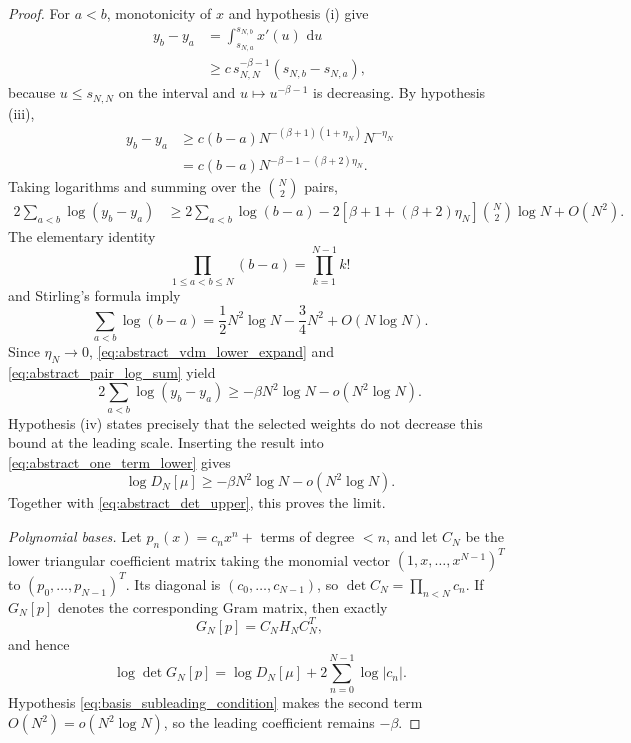 \documentclass[11pt]{amsart}
\numberwithin{equation}{section}
\theoremstyle{plain}
\theoremstyle{definition}
\theoremstyle{remark}
\newcommand{\dd}{\,\mathrm d}
\begin{document}
\begin{proof}
For $a<b$, monotonicity of $x$ and hypothesis (i) give
\begin{align}
y_b-y_a
&=\int_{s_{N,a}}^{s_{N,b}}x'(u)\,\dd u\\
&\ge c\,s_{N,N}^{-\beta-1}(s_{N,b}-s_{N,a}),
\end{align}
because $u\le s_{N,N}$ on the interval and $u\mapsto u^{-\beta-1}$ is decreasing.  By hypothesis (iii),
\begin{align}
y_b-y_a
&\ge c(b-a)
N^{-(\beta+1)(1+\eta_N)}N^{-\eta_N}\\
&=c(b-a)N^{-\beta-1-(\beta+2)\eta_N}.
\label{eq:abstract_node_gap_lower_rigorous}
\end{align}
Taking logarithms and summing over the $\binom N2$ pairs,
\begin{align}
2\sum_{a<b}\log(y_b-y_a)
&\ge 2\sum_{a<b}\log(b-a)
-2[\beta+1+(\beta+2)\eta_N]\binom N2\log N
+O(N^2).
\label{eq:abstract_vdm_lower_expand}
\end{align}
The elementary identity
\begin{equation}
\prod_{1\le a<b\le N}(b-a)=\prod_{k=1}^{N-1}k!
\end{equation}
and Stirling's formula imply
\begin{equation}
\sum_{a<b}\log(b-a)
=\frac12N^2\log N-\frac34N^2+O(N\log N).
\label{eq:abstract_pair_log_sum}
\end{equation}
Since $\eta_N\to0$, \eqref{eq:abstract_vdm_lower_expand} and \eqref{eq:abstract_pair_log_sum} yield
\begin{equation}
2\sum_{a<b}\log(y_b-y_a)
\ge-\beta N^2\log N-o(N^2\log N).
\end{equation}
Hypothesis (iv) states precisely that the selected weights do not decrease this bound at the leading scale.  Inserting the result into \eqref{eq:abstract_one_term_lower} gives
\begin{equation}
\log D_N[\mu]
\ge-\beta N^2\log N-o(N^2\log N).
\label{eq:abstract_det_lower}
\end{equation}
Together with \eqref{eq:abstract_det_upper}, this proves the limit.

\emph{Polynomial bases.}
Let $p_n(x)=c_nx^n+$ terms of degree $<n$, and let $C_N$ be the lower triangular coefficient matrix taking the monomial vector $(1,x,\ldots,x^{N-1})^T$ to $(p_0,\ldots,p_{N-1})^T$.  Its diagonal is $(c_0,\ldots,c_{N-1})$, so
$\det C_N=\prod_{n<N}c_n$.  If $G_N[p]$ denotes the corresponding Gram matrix, then exactly
\begin{equation}
G_N[p]=C_NH_NC_N^T,
\end{equation}
and hence
\begin{equation}
\log\det G_N[p]
=\log D_N[\mu]+2\sum_{n=0}^{N-1}\log|c_n|.
\end{equation}
Hypothesis \eqref{eq:basis_subleading_condition} makes the second term $O(N^2)=o(N^2\log N)$, so the leading coefficient remains $-\beta$.
\end{proof}
\end{document}
